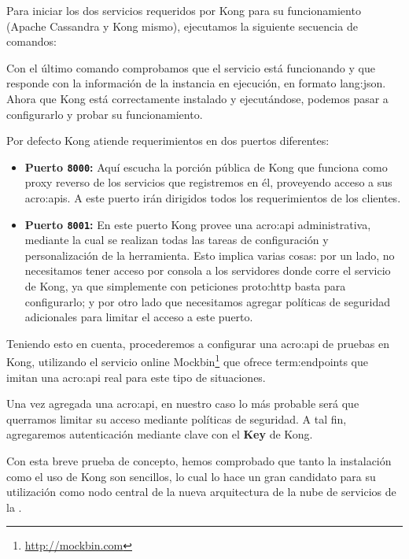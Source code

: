 Para iniciar los dos servicios requeridos por Kong para su funcionamiento (Apache Cassandra y Kong mismo), ejecutamos la siguiente secuencia de comandos:


Con el último comando comprobamos que el servicio está funcionando y que responde con la información de la instancia en ejecución, en formato \gls{lang:json}. Ahora que Kong está correctamente instalado y ejecutándose, podemos pasar a configurarlo y probar su funcionamiento.

Por defecto Kong atiende requerimientos en dos puertos diferentes:

\begin{itemize}
  \item \textbf{Puerto \texttt{8000}:} Aquí escucha la porción pública de Kong que funciona como proxy reverso de los servicios que registremos en él, proveyendo acceso a sus \glspl{acro:api}. A este puerto irán dirigidos todos los requerimientos de los clientes.
  \item \textbf{Puerto \texttt{8001}:} En este puerto Kong provee una \gls{acro:api} administrativa, mediante la cual se realizan todas las tareas de configuración y personalización de la herramienta. Esto implica varias cosas: por un lado, no necesitamos tener acceso por consola a los servidores donde corre el servicio de Kong, ya que simplemente con peticiones \gls{proto:http} basta para configurarlo; y por otro lado que necesitamos agregar políticas de seguridad adicionales para limitar el acceso a este puerto.
\end{itemize}

Teniendo esto en cuenta, procederemos a configurar una \gls{acro:api} de pruebas en Kong, utilizando el servicio online Mockbin\footnote{\url{http://mockbin.com}} que ofrece \glspl{term:endpoint} que imitan una \gls{acro:api} real para este tipo de situaciones.


Una vez agregada una \gls{acro:api}, en nuestro caso lo más probable será que querramos limitar su acceso mediante políticas de seguridad. A tal fin, agregaremos autenticación mediante clave con el  \textbf{Key} de Kong.


Con esta breve prueba de concepto, hemos comprobado que tanto la instalación como el uso de Kong son sencillos, lo cual lo hace un gran candidato para su utilización como nodo central de la nueva arquitectura de la nube de servicios de la \unlp.

